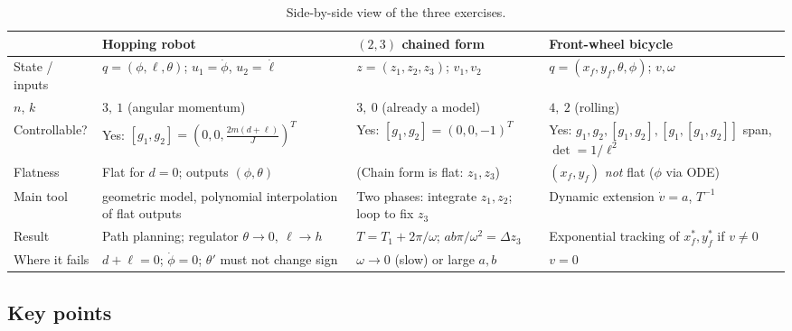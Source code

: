 \documentclass[11pt,a4paper]{article}
\def\boldsymbol#1{#1}%
\newcommand{\q}{\boldsymbol{q}}
\newcommand{\g}{\boldsymbol{g}}
\newcommand{\z}{\boldsymbol{z}}
\newcommand{\Tm}{\boldsymbol{T}}
\theoremstyle{definition}
\theoremstyle{plain}
\theoremstyle{remark}
\begin{document}
\begin{table}[h]
\centering
\small
\renewcommand{\arraystretch}{1.3}
\begin{tabular}{p{2.5cm}p{3.7cm}p{4.1cm}p{4.0cm}}
\toprule
 & \textbf{Hopping robot} & \textbf{$(2,3)$ chained form} & \textbf{Front-wheel bicycle}\\
\midrule
State / inputs & $\q=(\phi,\ell,\theta)$; $u_1=\dot\phi$, $u_2=\dot\ell$ & $\z=(z_1,z_2,z_3)$; $v_1,v_2$ & $\q=(x_f,y_f,\theta,\phi)$; $v,\omega$\\
$n$, $k$ & $3,\ 1$ (angular momentum) & $3,\ 0$ (already a model) & $4,\ 2$ (rolling)\\
Controllable? & Yes: $[\g_1,\g_2]=(0,0,\tfrac{2m(d+\ell)}{J})^T$ & Yes: $[\g_1,\g_2]=(0,0,-1)^T$ & Yes: $\g_1,\g_2,[\g_1,\g_2],[\g_1,[\g_1,\g_2]]$ span, $\det=1/\ell^2$\\
Flatness & Flat for $d=0$; outputs $(\phi,\theta)$ & (Chain form is flat: $z_1,z_3$) & $(x_f,y_f)$ \emph{not} flat ($\phi$ via ODE)\\
Main tool & geometric model, polynomial interpolation of flat outputs & Two phases: integrate $z_1,z_2$; loop to fix $z_3$ & Dynamic extension $\dot v=a$, $\Tm^{-1}$\\
Result & Path planning; regulator $\theta\to0,\ \ell\to h$ & $T=T_1+2\pi/\omega$; $ab\pi/\omega^2=\Delta z_3$ & Exponential tracking of $x_f^*,y_f^*$ if $v\ne0$\\
Where it fails & $d+\ell=0$; $\dot\phi=0$; $\theta'$ must not change sign & $\omega\to0$ (slow) or large $a,b$ & $v=0$\\
\bottomrule
\end{tabular}
\caption{Side-by-side view of the three exercises.}
\end{table}

\subsection{Key points}
\end{document}
